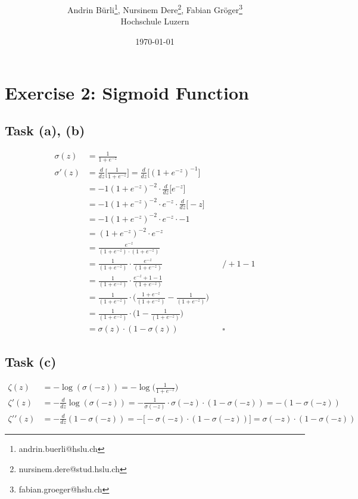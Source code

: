 \documentclass[onecolumn]{article}
\title{\spacecaps{Lab report: SW02 }\\ \normalsize \spacesc{TSM\_DeLearn} }
\author{Andrin Bürli\thanks{andrin.buerli@hslu.ch}, Nursinem Dere\thanks{nursinem.dere@stud.hslu.ch}, Fabian Gröger\thanks{fabian.groeger@hslu.ch}\\Hochschule Luzern}
\date{\today}
\begin{document}
\maketitle

\section{Exercise 2: Sigmoid Function}
\subsection{Task (a), (b)}
\begin{align*}
	\sigma(z) &= \frac{1}{1+e^{-z}} \\
	\sigma\prime(z) &= \frac{d}{dz} \Bigg[ \frac{1}{1+e^{-z}} \Bigg] = \frac{d}{dz} \Bigg[ (1+e^{-z})^{-1} \Bigg] \\
	&= -1 (1+e^{-z})^{-2} \cdot \frac{d}{dz} \Big[ e^{-z} \Big] \\
	&= -1 (1+e^{-z})^{-2} \cdot e^{-z} \cdot \frac{d}{dz} \Big[ -z \Big] \\
	&= -1 (1+e^{-z})^{-2} \cdot e^{-z} \cdot -1 \\
	&= (1+e^{-z})^{-2} \cdot e^{-z} \\
	&= \frac{e^{-z}}{(1+e^{-z}) \cdot (1+e^{-z})} \\
	&= \frac{1}{(1+e^{-z})} \cdot \frac{e^{-z}}{(1+e^{-z})} && /+1 -1 \\
	&= \frac{1}{(1+e^{-z})} \cdot \frac{e^{-z} +1 -1}{(1+e^{-z})} \\
	&= \frac{1}{(1+e^{-z})} \cdot \Bigg(\frac{1+ e^{-z}}{(1+e^{-z})} - \frac{1}{(1+e^{-z})}\Bigg) \\
	&= \frac{1}{(1+e^{-z})} \cdot \Bigg(1 - \frac{1}{(1+e^{-z})}\Bigg) \\
	&= \sigma(z) \cdot (1 - \sigma(z)) && \square
\end{align*}

\subsection{Task (c)}
\begin{align*}
	\zeta(z) &= -\log(\sigma(-z)) = -\log\Bigg(\frac{1}{1+e^{-z}}\Bigg) \\
	\zeta\prime(z) &= - \frac{d}{dz} \log (\sigma(-z)) = - \frac{1}{\sigma(-z)} \cdot \sigma(-z) \cdot (1 - \sigma(-z)) = - (1 - \sigma(-z)) \\
	\zeta\prime\prime(z) &= - \frac{d}{dz} (1 - \sigma(-z)) = - \Big[- \sigma(-z) \cdot (1 - \sigma(-z)) \Big] = \sigma(-z) \cdot (1 - \sigma(-z))
\end{align*}
\end{document}
